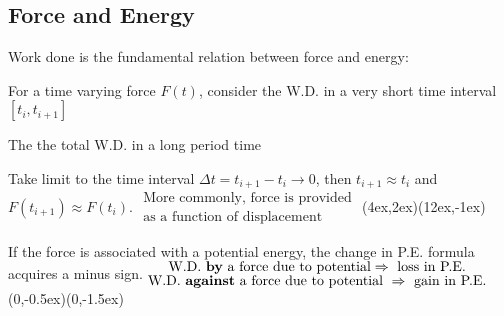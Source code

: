 \documentclass[class=article, crop=false, 12pt]{standalone}
\begin{document}
\subsection{Force and Energy}

Work done is the fundamental relation between force and energy:

For a time varying force $F(t)$, consider the W.D. in a very short time interval $[t_i, t_{i+1}]$

The the total W.D. in a long period time 

Take limit to the time interval $\Delta t = t_{i+1}-t_i \to 0$, then $t_{i+1}\approx t_i$ and $F(t_{i+1})\approx F(t_i)$.
{$\substack{\displaystyle\text{More commonly, force is provided} \\ \displaystyle\text{as a function of displacement}}$}
{(4ex,2ex)}{(12ex,-1ex)}

 If the force is associated with a potential energy,
the change in P.E. formula acquires a minus sign.
{$\substack{\displaystyle\text{W.D. \bf{by} a force due to potential} \Rightarrow \text{ loss in P.E.} \\ 
    \displaystyle\text{W.D. \bf{against} a force due to potential }\Rightarrow \text{ gain in P.E.}}$}
{(0,-0.5ex)}{(0,-1.5ex)}
\end{document}
